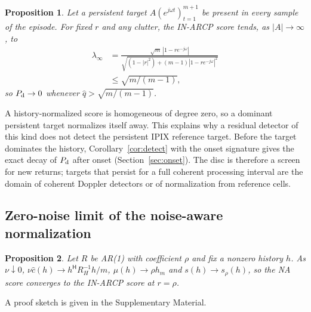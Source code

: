 \documentclass[journal]{IEEEtran}
\newtheorem{proposition}{Proposition}
\begin{document}
\begin{proposition}\label{prop:blind}
Let a persistent target $A(e^{j\omega t})_{t=1}^{m+1}$ be present in every sample of the episode. For fixed $r$ and any clutter, the IN-ARCP score tends, as $|A|\to\infty$, to
\begin{align*}
\lambda_\infty&=\frac{\sqrt m\,|1-re^{-j\omega}|}{\sqrt{(1-|r|^2)+(m-1)|1-re^{-j\omega}|^2}}\\
&\le\sqrt{m/(m-1)},
\end{align*}
so $P_{\rm d}\to0$ whenever $\widehat q>\sqrt{m/(m-1)}$.
\end{proposition}
A history-normalized score is homogeneous of degree zero, so a dominant persistent target normalizes itself away. This explains why a residual detector of this kind does not detect the persistent IPIX reference target. Before the target dominates the history, Corollary~\ref{cor:detect} with the onset signature gives the exact decay of $P_{\rm d}$ after onset (Section~\ref{sec:onset}). The disc is therefore a screen for new returns; targets that persist for a full coherent processing interval are the domain of coherent Doppler detectors or of normalization from reference cells.

\subsection{Zero-noise limit of the noise-aware normalization}
\begin{proposition}\label{prop:reduce}
Let $R$ be AR(1) with coefficient $\rho$ and fix a nonzero history $h$. As $\nu\downarrow0$, $\nu\widehat c(h)\to h^{\mathsf H}R_H^{-1}h/m$, $\mu(h)\to\rho h_m$ and $s(h)\to s_\rho(h)$, so the NA score converges to the IN-ARCP score at $r=\rho$.
\end{proposition}
A proof sketch is given in the Supplementary Material.
\end{document}
